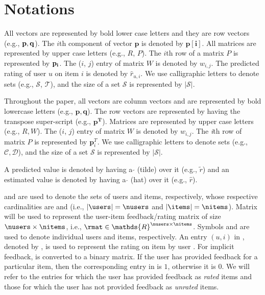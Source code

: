 \chapter{Notations}
\label{ch:notations}


All vectors are represented by bold lower case letters and they are row vectors (e.g., $\bf{p}, \bf{q}$). 
The $i$th component of vector $\bm{p}$ is denoted
by $\bm{p[i]}$. All matrices are represented by upper
case letters (e.g., $R$, $P$). The $i$th row of a matrix $P$  is represented by $\bf{p_i}$. The ($i$, $j$) entry of matrix $W$ is denoted by
$w_{i,j}$.
The predicted rating of user $u$ on item $i$ is denoted by $\hat{r}_{u,i}$.
We use calligraphic letters to denote sets (e.g., $\mathcal{S}$, $\mathcal{T}$), and the size of a set $\mathcal{S}$ is represented by
$|\mathcal{S}|$.







\iffalse

Throughout the paper, all vectors are column vectors and are represented by
bold lowercase letters (e.g., $\bm{p,q}$). The row vectors are represented by
having the transpose super-script (e.g., $\bm{p^T}$). Matrices are represented by upper
case letters (e.g., ${R,W}$). The ($i$, $j$) entry of matrix $W$ is denoted by
$w_{i,j}$. The \textit{i}th row of matrix $P$ is represented by $\bm{p}_i^T$. We use calligraphic letters to denote sets (e.g.,
$\mathcal{C,D}$), and the size of a set $\mathcal{S}$ is represented by
$|\mathcal{S}|$. 
 
 
A predicted value is denoted by having a
$\mathbf{\tilde{}}$ (tilde) over it (e.g., $\tilde {r}$) and an estimated value
is denoted by having a $\mathbf{\hat{}}$ (hat) over it (e.g., $\hat {r}$).

\users and \items are used to denote the sets of users and items, respectively,
whose respective cardinalities are \nusers and \nitems (i.e., $|\users| =
\nusers$ and $|\items| = \nitems$). Matrix \rmat will be used to represent the
user-item feedback/rating matrix of size $\nusers \times \nitems$, i.e., $\rmat
\in \mathds{R}^{\nusers \times \nitems}$. Symbols \usru and \itmi are used to denote
individual users and items, respectively. An entry $(u, i)$ in \rmat, denoted by
\rui, is used to represent the rating on item \itmi by user \usru.
%
For implicit feedback, \rmat is converted to a binary matrix. If the user has
provided feedback for a particular item, then the corresponding entry in \rmat
is $1$, otherwise it is $0$. We will refer to the entries for which the user
has provided feedback as \emph{rated} items and those for which the user has
not provided feedback as \emph{unrated} items.

